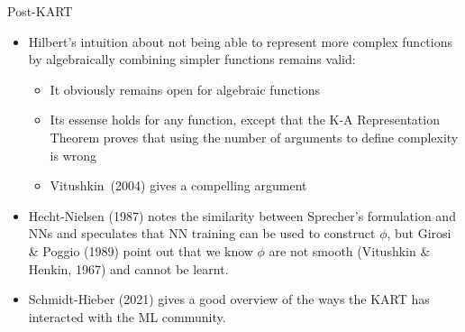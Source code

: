 \begin{frame}{Post-KART}

\begin{itemize}
\item Hilbert's intuition about not being able to represent more
  complex functions by algebraically combining simpler functions remains valid:
  \begin{itemize}
  \item It obviously remains open for algebraic functions
  \item Its essense holds for any function, except that the K-A
    Representation Theorem proves that using the number of arguments
    to define complexity is wrong
  \item \textcolor{citations}{Vitushkin~(2004)} gives a compelling argument
  \end{itemize}
\vspace{0.5em}
\item \textcolor{citations}{Hecht-Nielsen (1987)} notes the similarity between Sprecher's
  formulation and NNs and speculates that NN training can be used to
  construct $\phi$, but \textcolor{citations}{Girosi \& Poggio (1989)} point out that we know
  $\phi$ are not smooth \textcolor{citations}{(Vitushkin \& Henkin, 1967)} and cannot be
  learnt.
\vspace{0.5em}
\item \textcolor{citations}{Schmidt-Hieber (2021)} gives a good overview of the ways the KART
  has interacted with the ML community.
  
\end{itemize}

\end{frame}
